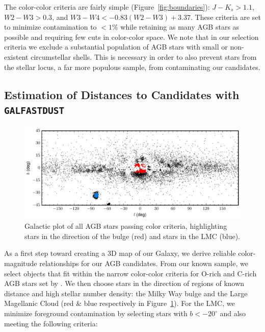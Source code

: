 The color-color criteria are fairly simple (Figure~\ref{fig:boundaries}): $J-K_s > 1.1$, $W2-W3 > 0.3$, and $W3-W4 < -0.83(W2-W3) + 3.37$. These criteria are set to minimize contamination to  $<1\%$ while retaining as many AGB stars as possible and requiring few cuts in color-color space. We note that in our selection criteria we exclude a substantial population of AGB stars with small or non-existent circumstellar shells. This is necessary in order to also prevent stars from the stellar locus, a far more populous sample, from contaminating our candidates.

\subsection{Estimation of Distances to Candidates with {\tt GALFASTDUST}}
\begin{figure}[h]
\centering
\includegraphics[width=6in]{figs/bulge_lmc_galcoords.pdf}
\caption{{\footnotesize Galactic plot of all AGB stars passing color criteria, highlighting stars in the direction of the bulge (red) and stars in the LMC (blue).}}
\label{fig:galplot}
\end{figure}

As a first step toward creating a 3D map of our Galaxy, we derive reliable color-magnitude relationships for our AGB candidates. From our known sample, we select objects that fit within the narrow color-color criteria for O-rich and C-rich AGB stars set by \cite{2014MNRAS.442.3361N}. We then choose stars in the direction of regions of known distance and high stellar number density: the Milky Way bulge and the Large Magellanic Cloud (red \& blue respectively in Figure~\ref{fig:galplot}). For the LMC, we minimize foreground contamination by selecting stars with $b < -20^\circ$ and also meeting the following criteria:

